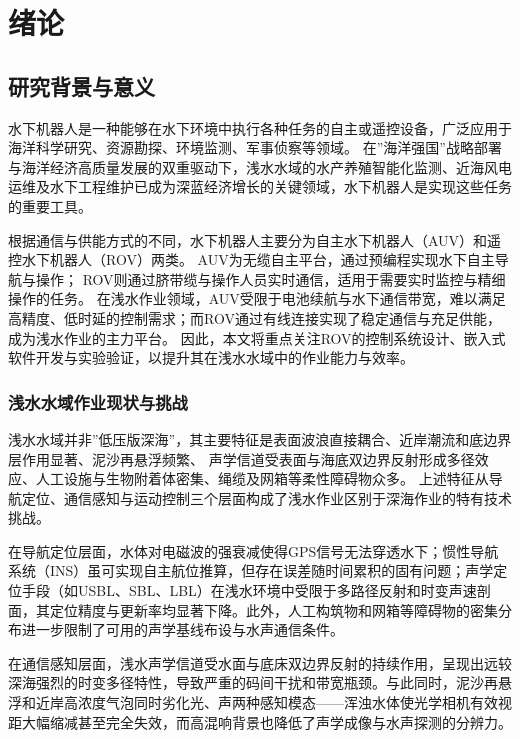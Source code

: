
\chapter{绪论}

\section{研究背景与意义}

水下机器人是一种能够在水下环境中执行各种任务的自主或遥控设备，广泛应用于海洋科学研究、资源勘探、环境监测、军事侦察等领域。
在”海洋强国”战略部署与海洋经济高质量发展的双重驱动下，浅水水域的水产养殖智能化监测、近海风电运维及水下工程维护已成为深蓝经济增长的关键领域，水下机器人是实现这些任务的重要工具\cite{Xu2023}。

根据通信与供能方式的不同，水下机器人主要分为自主水下机器人（AUV）和遥控水下机器人（ROV）两类。
AUV为无缆自主平台，通过预编程实现水下自主导航与操作\cite{Kang2023, ma2025state}；
ROV则通过脐带缆与操作人员实时通信，适用于需要实时监控与精细操作的任务\cite{singh2022review}。
在浅水作业领域，AUV受限于电池续航与水下通信带宽，难以满足高精度、低时延的控制需求；而ROV通过有线连接实现了稳定通信与充足供能，成为浅水作业的主力平台。
因此，本文将重点关注ROV的控制系统设计、嵌入式软件开发与实验验证，以提升其在浅水水域中的作业能力与效率。

\subsection{浅水水域作业现状与挑战}

浅水水域并非”低压版深海”，其主要特征是表面波浪直接耦合、近岸潮流和底边界层作用显著、泥沙再悬浮频繁、
声学信道受表面与海底双边界反射形成多径效应、人工设施与生物附着体密集、绳缆及网箱等柔性障碍物众多\cite{hasan2024oceanic}。
上述特征从导航定位、通信感知与运动控制三个层面构成了浅水作业区别于深海作业的特有技术挑战。

在导航定位层面，水体对电磁波的强衰减使得GPS信号无法穿透水下；惯性导航系统（INS）虽可实现自主航位推算，但存在误差随时间累积的固有问题；声学定位手段（如USBL、SBL、LBL）在浅水环境中受限于多路径反射和时变声速剖面，其定位精度与更新率均显著下降\cite{alexandris2024positioning}。此外，人工构筑物和网箱等障碍物的密集分布进一步限制了可用的声学基线布设与水声通信条件\cite{wu2024review}。

在通信感知层面，浅水声学信道受水面与底床双边界反射的持续作用，呈现出远较深海强烈的时变多径特性，导致严重的码间干扰和带宽瓶颈\cite{zhou2024simplified}。与此同时，泥沙再悬浮和近岸高浓度气泡同时劣化光、声两种感知模态——浑浊水体使光学相机有效视距大幅缩减甚至完全失效，而高混响背景也降低了声学成像与水声探测的分辨力。

